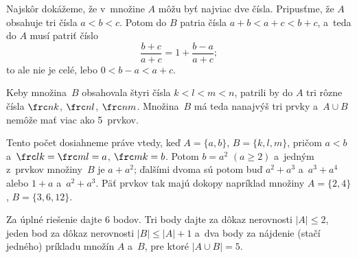 {%
Najskôr dokážeme, že v~množine $A$ môžu byť najviac dve čísla. Pripusťme, že $A$ obsahuje tri čísla $a<b<c$. Potom do $B$ patria čísla $a+b<a+c<b+c$, a~teda do $A$ musí patriť číslo
$$
\frac{b+c}{a+c}=1+\frac{b-a}{a+c};
$$
to ale nie je celé, lebo $0<b-a<a+c$.

Keby množina~$B$ obsahovala štyri čísla $k<l<m<n$, patrili by do $A$ tri rôzne čísla $\frc nk$, $\frc nl$, $\frc nm$. Množina~$B$ má teda nanajvýš tri prvky a~$A\cup B$ nemôže mať viac ako 5~prvkov.

Tento počet dosiahneme práve vtedy, keď $A=\{a,b\}$, $B=\{k,l,m\}$, pričom $a<b$ a~$\frc lk=\frc ml=a$, $\frc mk=b$.
Potom $b=a^2$ $(a\ge2)$ a~jedným z~prvkov množiny~$B$ je $a+a^2$; ďalšími dvoma sú potom buď $a^2+a^3$ a~$a^3+a^4$
alebo $1+a$ a~$a^2+a^3$. Päť prvkov tak majú dokopy napríklad množiny $A=\{2,4\}$, $B=\{3,6,12\}$.

\nobreak\medskip\petit\noindent
Za úplné riešenie dajte 6 bodov.
Tri body dajte za dôkaz nerovnosti $|A|\le2$, jeden bod za dôkaz nerovnosti
$|B|\le|A|+1$ a~dva body za nájdenie (stačí jedného) príkladu množín $A$ a~$B$,
pre ktoré $|A\cup B|=5$.
\endpetit
\bigbreak
}

